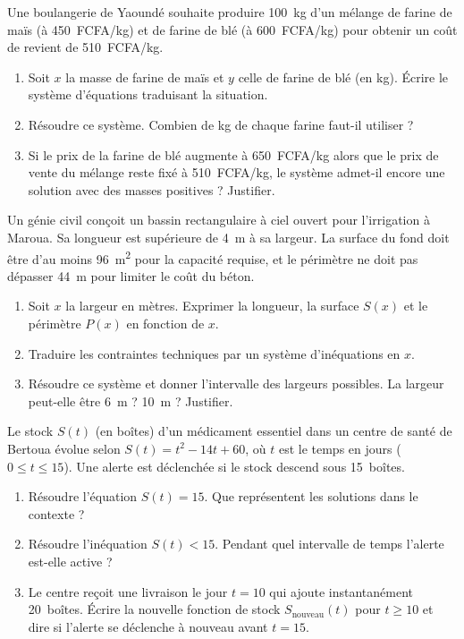 \documentclass[11pt]{article}
\begin{document}
\begin{exercice}
Une boulangerie de Yaoundé souhaite produire \SI{100}{kg} d'un mélange de farine de maïs (à \SI{450}{FCFA/kg}) et de farine de blé (à \SI{600}{FCFA/kg}) pour obtenir un coût de revient de \SI{510}{FCFA/kg}.
\begin{enumerate}
    \item Soit $x$ la masse de farine de maïs et $y$ celle de farine de blé (en kg). Écrire le système d'équations traduisant la situation.
    \item Résoudre ce système. Combien de kg de chaque farine faut-il utiliser ?
    \item Si le prix de la farine de blé augmente à \SI{650}{FCFA/kg} alors que le prix de vente du mélange reste fixé à \SI{510}{FCFA/kg}, le système admet-il encore une solution avec des masses positives ? Justifier.
\end{enumerate}
\end{exercice}

\begin{exercice}
Un génie civil conçoit un bassin rectangulaire à ciel ouvert pour l'irrigation à Maroua. Sa longueur est supérieure de \SI{4}{m} à sa largeur. La surface du fond doit être d'au moins \SI{96}{m^2} pour la capacité requise, et le périmètre ne doit pas dépasser \SI{44}{m} pour limiter le coût du béton.
\begin{enumerate}
    \item Soit $x$ la largeur en mètres. Exprimer la longueur, la surface $S(x)$ et le périmètre $P(x)$ en fonction de $x$.
    \item Traduire les contraintes techniques par un système d'inéquations en $x$.
    \item Résoudre ce système et donner l'intervalle des largeurs possibles. La largeur peut-elle être \SI{6}{m} ? \SI{10}{m} ? Justifier.
\end{enumerate}
\end{exercice}

\begin{exercice}
Le stock $S(t)$ (en boîtes) d'un médicament essentiel dans un centre de santé de Bertoua évolue selon $S(t) = t^2 - 14t + 60$, où $t$ est le temps en jours ($0 \le t \le 15$). Une alerte est déclenchée si le stock descend sous \SI{15}{boîtes}.
\begin{enumerate}
    \item Résoudre l'équation $S(t) = 15$. Que représentent les solutions dans le contexte ?
    \item Résoudre l'inéquation $S(t) < 15$. Pendant quel intervalle de temps l'alerte est-elle active ?
    \item Le centre reçoit une livraison le jour $t=10$ qui ajoute instantanément \SI{20}{boîtes}. Écrire la nouvelle fonction de stock $S_{\text{nouveau}}(t)$ pour $t \ge 10$ et dire si l'alerte se déclenche à nouveau avant $t=15$.
\end{enumerate}
\end{exercice}
\end{document}
